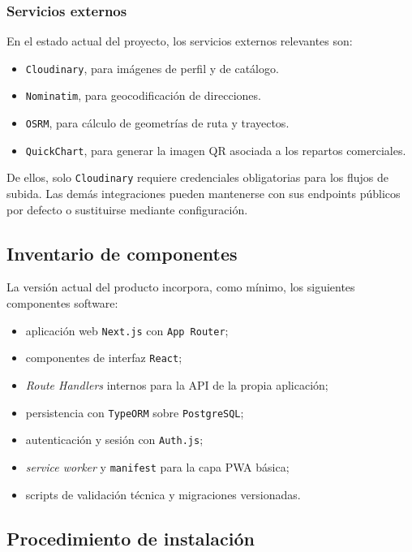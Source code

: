 \subsubsection*{Servicios externos}

En el estado actual del proyecto, los servicios externos relevantes son:

\begin{itemize}
    \item \texttt{Cloudinary}, para imágenes de perfil y de catálogo.
    \item \texttt{Nominatim}, para geocodificación de direcciones.
    \item \texttt{OSRM}, para cálculo de geometrías de ruta y trayectos.
    \item \texttt{QuickChart}, para generar la imagen QR asociada a los repartos comerciales.
\end{itemize}

De ellos, solo \texttt{Cloudinary} requiere credenciales obligatorias para los flujos de subida. Las demás integraciones pueden mantenerse con sus endpoints públicos por defecto o sustituirse mediante configuración.

\subsection{Inventario de componentes}

La versión actual del producto incorpora, como mínimo, los siguientes componentes software:

\begin{itemize}
    \item aplicación web \texttt{Next.js} con \texttt{App Router};
    \item componentes de interfaz \texttt{React};
    \item \textit{Route Handlers} internos para la API de la propia aplicación;
    \item persistencia con \texttt{TypeORM} sobre \texttt{PostgreSQL};
    \item autenticación y sesión con \texttt{Auth.js};
    \item \textit{service worker} y \texttt{manifest} para la capa PWA básica;
    \item scripts de validación técnica y migraciones versionadas.
\end{itemize}

\subsection{Procedimiento de instalación}

